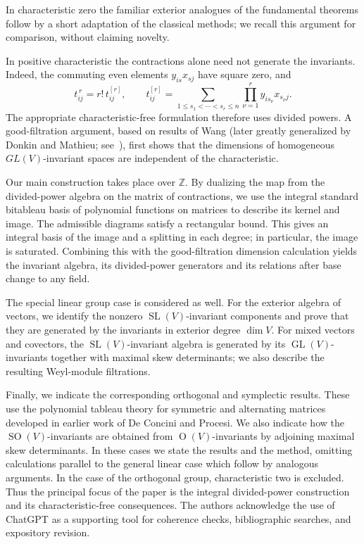 \documentclass[10pt]{amsart}
\theoremstyle{definition}
\theoremstyle{remark}
\newcommand{\GL}{\operatorname{GL}}
\newcommand{\SL}{\operatorname{SL}}
\newcommand{\OO}{\operatorname{O}}
\newcommand{\SO}{\operatorname{SO}}
\begin{document}
In characteristic zero the familiar
exterior analogues of the fundamental theorems follow by a short adaptation
of the classical methods; we recall this argument for comparison, without
claiming novelty.\smallskip



In positive characteristic the contractions alone need not generate the
invariants. Indeed, the commuting even elements $y_{is}x_{sj}$ have square
zero, and
\[
 t_{ij}^{\,r}=r!\,t_{ij}^{[r]},\qquad
 t_{ij}^{[r]}=\sum_{1\le s_1<\cdots<s_r\le n}
       \prod_{\nu=1}^{r}y_{is_\nu}x_{s_\nu j}.
\]
The appropriate characteristic-free formulation therefore uses divided
powers. A good-filtration argument, based on results of Wang \cite{Wang} (later greatly generalized by 
Donkin
and Mathieu; see~\cite{Donkin,Mathieu,Jantzen}), first shows that the dimensions of homogeneous
$GL(V)$-invariant spaces are independent of the characteristic.

Our main construction takes place over $\mathbb Z$. By dualizing the map from
the divided-power algebra on the matrix of contractions, we use the integral
standard bitableau basis of  polynomial  functions on matrices  to describe its
kernel and image. The admissible diagrams satisfy a rectangular bound. This
gives an integral basis of the image and a splitting in each degree; in
particular, the image is saturated. Combining this with the good-filtration
dimension calculation yields the invariant algebra, its divided-power
generators and its relations after base change to any field.

The special linear group case is considered as well. For the exterior algebra of vectors,
we identify the nonzero $\SL(V)$-invariant components and prove that they
are generated by the invariants in exterior degree $\dim V$. For mixed
vectors and covectors, the $\SL(V)$-invariant algebra is generated by
its $\GL(V)$-invariants together with  maximal skew determinants;
we also describe the resulting Weyl-module filtrations. 

Finally, we indicate the corresponding orthogonal and symplectic results.
These use the polynomial tableau theory for symmetric and alternating
matrices developed in earlier work of De Concini and Procesi. We also indicate how
the $\SO(V)$-invariants are obtained from $\OO(V)$-invariants by adjoining
 maximal skew determinants.
In these cases we state the
results and the method, omitting calculations parallel to the general linear
case which follow by analogous arguments.  In the case of the orthogonal group, characteristic two is excluded. Thus the
principal focus of the paper is the integral divided-power construction and
its characteristic-free consequences.  The authors acknowledge the use of  ChatGPT as a supporting tool for coherence checks, bibliographic searches, and expository revision.
\end{document}
